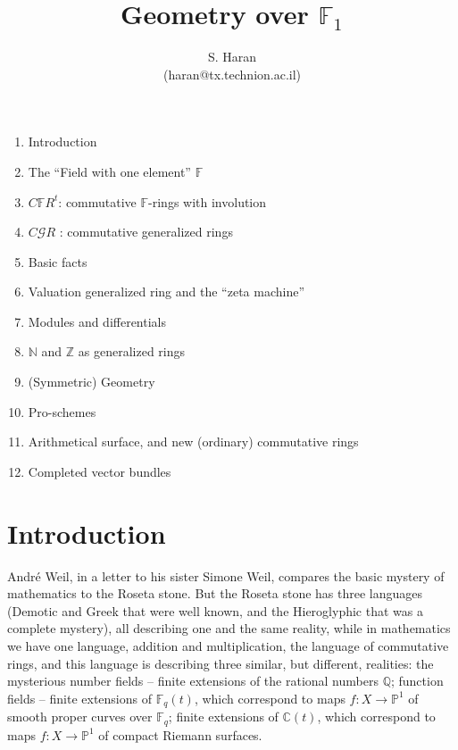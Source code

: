 \documentclass[leqno]{article}
\title{Geometry over ${\mathbb F}_1$}
\author{S. Haran \\ {\footnotesize (haran@tx.technion.ac.il)}}
\numberwithin{equation}{section}
\begin{document}
\maketitle

\vglue 2cm


\begin{enumerate}
\item[0.] Introduction

\item[1.] The ``Field with one element'' ${\mathbb F}$

\item[2.] $C{\mathbb F} R^t$: commutative ${\mathbb F}$-rings with involution

\item[3.] $C {\mathcal G} R$ : commutative generalized rings

\item[4.] Basic facts

\item[5.] Valuation generalized ring and the ``zeta machine''

\item[6.] Modules and differentials

\item[7.] ${\mathbb N}$ and ${\mathbb Z}$ as generalized rings

\item[8.] (Symmetric) Geometry

\item[9.] Pro-schemes

\item[10.] Arithmetical surface, and new (ordinary) commutative rings

\item[11.] Completed vector bundles
\end{enumerate}

\newpage

\setcounter{section}{-1}
\section{Introduction}

Andr\'e Weil, in a letter to his sister Simone Weil, compares the basic mystery of mathematics to the Roseta stone. But the Roseta stone has three languages (Demotic and Greek that were well known, and the Hieroglyphic that was a complete mystery), all describing one and the same reality, while in mathematics we have one language, addition and multiplication, the language of commutative rings, and this language is describing three similar, but different, realities: the mysterious number fields -- finite extensions of the rational numbers ${\mathbb Q}$; function fields -- finite extensions of ${\mathbb F}_q (t)$, which correspond to maps $f : X \to {\mathbb P}^1$ of smooth proper curves over ${\mathbb F}_q$; finite extensions of ${\mathbb C} (t)$, which correspond to maps $f : X \to {\mathbb P}^1$ of compact Riemann surfaces. 
\end{document}
